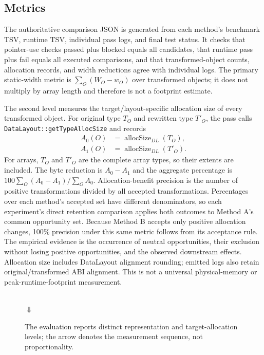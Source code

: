 \documentclass[11pt,twocolumn]{article}
\begin{document}
\subsection{Metrics}

The authoritative comparison JSON is generated from each method's benchmark
TSV, runtime TSV, individual pass logs, and final test status. It checks that
pointer-use checks passed plus blocked equals all candidates, that runtime pass plus fail equals all
executed comparisons, and that transformed-object counts, allocation records,
and width reductions agree with individual logs. The primary static-width
metric is $\sum_{O}(W_O-w_O)$ over transformed objects; it does not multiply by
array length and therefore is not a footprint estimate.

The second level measures the target/layout-specific allocation size of every
transformed object. For original type $T_O$ and rewritten type $T'_O$, the pass
calls \texttt{DataLayout::getTypeAllocSize} and records
\begin{align}
 A_0(O)&=\operatorname{allocSize}_{DL}(T_O),\\
 A_1(O)&=\operatorname{allocSize}_{DL}(T'_O).
\end{align}
For arrays, $T_O$ and $T'_O$ are the complete array types, so their extents are
included. The byte reduction is $A_0-A_1$ and the aggregate percentage is
$100\sum_O(A_0-A_1)/\sum_O A_0$. Allocation-benefit precision is the number of
positive transformations divided by all accepted transformations. Percentages
over each method's accepted set have different denominators, so each
experiment's direct retention comparison applies both outcomes to Method A's
common opportunity set.
Because Method B accepts only positive allocation changes, 100\% precision
under this same metric follows from its acceptance rule. The empirical evidence
is the occurrence of neutral opportunities, their exclusion without losing
positive opportunities, and the observed downstream effects.
Allocation size includes DataLayout alignment rounding; emitted logs also
retain original/transformed ABI alignment. This is not a universal
physical-memory or peak-runtime-footprint measurement.

\begin{figure}[t]
\centering
\setlength{\fboxsep}{5pt}
\\[-1pt]{\Large$\Downarrow$}\\[-1pt]
\caption{The evaluation reports distinct representation and target-allocation
levels; the arrow denotes the measurement sequence, not proportionality.}
\label{fig:two-levels}
\end{figure}
\end{document}
